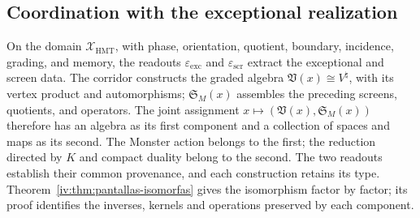 \subsection{Coordination with the exceptional realization}

On the domain \(\mathcal X_{\mathrm{HMT}}\), with phase, orientation,
quotient, boundary, incidence, grading, and memory, the readouts
\(\varepsilon_{\mathrm{exc}}\) and \(\varepsilon_{\mathrm{scr}}\) extract
the exceptional and screen data. The corridor constructs the graded
algebra \(\mathfrak V(x)\cong V^\natural\), with its vertex product
and automorphisms; \(\mathfrak S_M(x)\) assembles the preceding screens, quotients,
and operators. The joint assignment
\(x\mapsto(\mathfrak V(x),\mathfrak S_M(x))\) therefore has an
algebra as its first component and a collection of spaces and maps as its second.
The Monster action belongs to the first; the reduction directed by \(K\)
and compact duality belong to the second. The two readouts establish their common
provenance, and each construction retains its type.
Theorem~\ref{iv:thm:pantallas-isomorfas} gives the isomorphism
factor by factor; its proof identifies the inverses, kernels
and operations preserved by each component.
\par\endgroup
